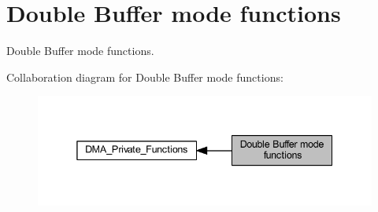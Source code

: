 \hypertarget{group___d_m_a___group3}{}\section{Double Buffer mode functions}
\label{group___d_m_a___group3}


Double Buffer mode functions.  


Collaboration diagram for Double Buffer mode functions\+:
\nopagebreak
\begin{figure}[H]
\begin{center}
\leavevmode
\includegraphics[width=338pt]{group___d_m_a___group3}
\end{center}
\end{figure}
